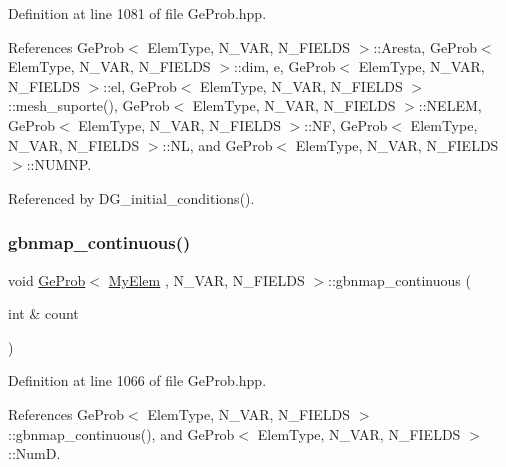 Definition at line 1081 of file Ge\+Prob.\+hpp.



References Ge\+Prob$<$ Elem\+Type, N\+\_\+\+V\+A\+R, N\+\_\+\+F\+I\+E\+L\+D\+S $>$\+::\+Aresta, Ge\+Prob$<$ Elem\+Type, N\+\_\+\+V\+A\+R, N\+\_\+\+F\+I\+E\+L\+D\+S $>$\+::dim, e, Ge\+Prob$<$ Elem\+Type, N\+\_\+\+V\+A\+R, N\+\_\+\+F\+I\+E\+L\+D\+S $>$\+::el, Ge\+Prob$<$ Elem\+Type, N\+\_\+\+V\+A\+R, N\+\_\+\+F\+I\+E\+L\+D\+S $>$\+::mesh\+\_\+suporte(), Ge\+Prob$<$ Elem\+Type, N\+\_\+\+V\+A\+R, N\+\_\+\+F\+I\+E\+L\+D\+S $>$\+::\+N\+E\+L\+EM, Ge\+Prob$<$ Elem\+Type, N\+\_\+\+V\+A\+R, N\+\_\+\+F\+I\+E\+L\+D\+S $>$\+::\+NF, Ge\+Prob$<$ Elem\+Type, N\+\_\+\+V\+A\+R, N\+\_\+\+F\+I\+E\+L\+D\+S $>$\+::\+NL, and Ge\+Prob$<$ Elem\+Type, N\+\_\+\+V\+A\+R, N\+\_\+\+F\+I\+E\+L\+D\+S $>$\+::\+N\+U\+M\+NP.



Referenced by D\+G\+\_\+initial\+\_\+conditions().

\mbox{\label{classGeProb_a4a405a3f566e10cf77906d21606c97bd}} 
\subsubsection{\texorpdfstring{gbnmap\+\_\+continuous()}{gbnmap\_continuous()}\hspace{0.1cm}{\footnotesize\ttfamily [2/2]}}
{\footnotesize\ttfamily void \hyperlink{classGeProb}{Ge\+Prob}$<$ \hyperlink{DG__Prob_8h_a83cd887ced9a6587428f267e50cd4787}{My\+Elem} , N\+\_\+\+V\+AR, N\+\_\+\+F\+I\+E\+L\+DS $>$\+::gbnmap\+\_\+continuous (\begin{DoxyParamCaption}\item[{int \&}]{count }\end{DoxyParamCaption})\hspace{0.3cm}{\ttfamily [inherited]}}



Definition at line 1066 of file Ge\+Prob.\+hpp.



References Ge\+Prob$<$ Elem\+Type, N\+\_\+\+V\+A\+R, N\+\_\+\+F\+I\+E\+L\+D\+S $>$\+::gbnmap\+\_\+continuous(), and Ge\+Prob$<$ Elem\+Type, N\+\_\+\+V\+A\+R, N\+\_\+\+F\+I\+E\+L\+D\+S $>$\+::\+NumD.

\mbox{\label{classGeProb_a4ceec7b2e7cad8ba29dd8d751840a22b}} 
